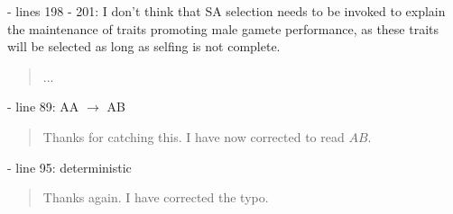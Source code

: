 \documentclass[11pt]{article}
\begin{document}
 - lines 198 - 201: I don't think that SA selection needs to be invoked to explain the maintenance of traits promoting male gamete performance, as these traits will be selected as long as selfing is not complete.

	\begin{quote}
		...
	\end{quote}

 - line 89: AA $\rightarrow$ AB

	\begin{quote}
		Thanks for catching this. I have now corrected to read $AB$.
	\end{quote}

 - line 95: deterministic

	\begin{quote}
		Thanks again. I have corrected the typo.
	\end{quote}
\end{document}
